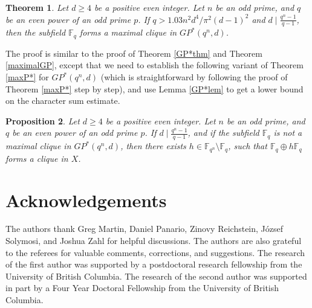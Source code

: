 \documentclass[12pt,reqno]{amsart}
\newtheorem{thm}{Theorem}[section]
\newtheorem{prop}[thm]{Proposition}
\theoremstyle{definition}
\newcommand{\F}{\mathbb{F}}
\begin{document}
\begin{thm}
Let $d \geq 4$ be a positive even integer. Let $n$ be an odd prime, and $q$ be an even power of an odd prime $p$. If $q>1.03n^2d^4/\pi^2(d-1)^2$ and $d \mid \frac{q^n-1}{q-1}$, then the subfield $\F_q$ forms a maximal clique in $GP^*(q^n,d)$.
\end{thm}

The proof is similar to the proof of Theorem \ref{GP*thm} and Theorem \ref{maximalGP}, except that we need to establish the following variant of Theorem \ref{maxP*} for $GP^*(q^n,d)$ (which is straightforward by following the proof of Theorem \ref{maxP*} step by step), and use Lemma \ref{GP*lem} to get a lower bound on the character sum estimate.

\begin{prop}
Let $d \geq 4$ be a positive even integer. Let $n$ be an odd prime, and $q$ be an even power of an odd prime $p$. If $d \mid \frac{q^n-1}{q-1}$, and if the subfield $\F_q$ is not a maximal clique in $GP^*(q^n,d)$, then  there exists $h \in \F_{q^n} \setminus \F_q$, such that $\F_q \oplus h\F_q$ forms a clique in $X$. 
\end{prop}

\section*{Acknowledgements}
The authors thank Greg Martin, Daniel Panario, Zinovy Reichstein, J\'ozsef Solymosi, and Joshua Zahl for helpful discussions. The authors are also grateful to the referees for valuable comments, corrections, and suggestions. The research of the first author was supported by a postdoctoral research fellowship from the University of British Columbia. The research of the second author was supported in part by a Four Year Doctoral Fellowship from the University of British Columbia.



\end{document}
